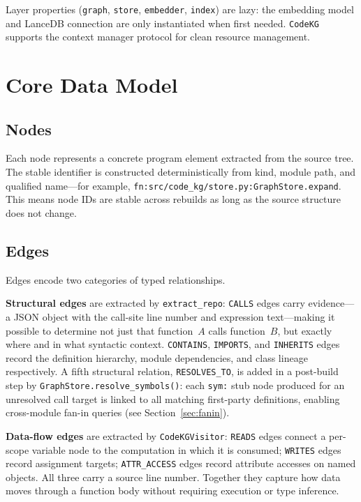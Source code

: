 \documentclass[10pt]{article}
\begin{document}
Layer properties (\texttt{graph}, \texttt{store}, \texttt{embedder}, \texttt{index})
are lazy: the embedding model and LanceDB connection are only instantiated when
first needed. \texttt{CodeKG} supports the context manager protocol for clean
resource management.

\section{Core Data Model}

\subsection{Nodes}

Each node represents a concrete program element extracted from the source tree.
The stable identifier is constructed deterministically from kind, module path, and
qualified name---for example, \texttt{fn:src/code\_kg/\allowbreak store.py:\allowbreak GraphStore.expand}.
This means node IDs are stable across rebuilds as long as the source structure
does not change.

\subsection{Edges}

Edges encode two categories of typed relationships.

\textbf{Structural edges} are extracted by \texttt{extract\_repo}: \texttt{CALLS}
edges carry evidence---a JSON object with the call-site line number and expression
text---making it possible to determine not just that function~$A$ calls
function~$B$, but exactly where and in what syntactic context. \texttt{CONTAINS},
\texttt{IMPORTS}, and \texttt{INHERITS} edges record the definition hierarchy,
module dependencies, and class lineage respectively. A fifth structural relation,
\texttt{RESOLVES\_TO}, is added in a post-build step by
\texttt{GraphStore.resolve\_symbols()}: each \texttt{sym:} stub node produced
for an unresolved call target is linked to all matching first-party definitions,
enabling cross-module fan-in queries (see Section~\ref{sec:fanin}).

\textbf{Data-flow edges} are extracted by \texttt{CodeKGVisitor}: \texttt{READS}
edges connect a per-scope variable node to the computation in which it is consumed;
\texttt{WRITES} edges record assignment targets; \texttt{ATTR\_ACCESS} edges record
attribute accesses on named objects. All three carry a source line number. Together
they capture how data moves through a function body without requiring execution or
type inference.
\end{document}
